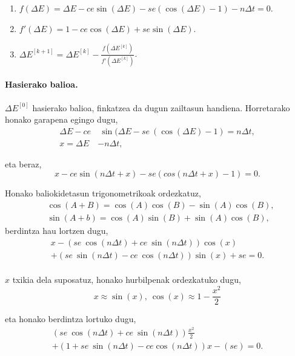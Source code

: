 \begin{enumerate}
\item $f(\Delta E)=\Delta E - ce \sin(\Delta E)- se (\cos(\Delta E)-1)-n \Delta t=0$.

\item $f'(\Delta E)=1-ce \cos(\Delta E)+ se \sin(\Delta E)$.

\item $\Delta E^{[k+1]}=\Delta E^{[k]}- \frac{f(\Delta E^{[k]})}{f'(\Delta E^{[k]})}$.

\end{enumerate}

\paragraph*{Hasierako balioa.} $\Delta E^{[0]}$ hasierako balioa, finkatzea da dugun zailtasun handiena. Horretarako honako garapena egingo dugu,
\begin{align*}
\Delta E - ce& \ \sin(\Delta E- se \ (\cos(\Delta E)-1)=n \Delta t, \\
x= \Delta E &- n \Delta t,
\end{align*}

eta beraz,
\begin{equation*}
x-ce \sin(n\Delta t+x)-se(cos(n \Delta t+x)-1)=0.
\end{equation*}

Honako baliokidetasun trigonometrikoak ordezkatuz,
\begin{align*}
& \cos(A+B) =\cos(A)\cos(B)-\sin(A)\cos(B),\\
& \sin(A+b) =\cos(A)\sin(B)+\sin(A)\cos(B),
\end{align*}
berdintza hau lortzen dugu,
\begin{multline*}
x- (se \ \cos(n \Delta t)+ ce \ \sin(n \Delta t)) \cos(x) \\
    + (se \ \sin(n \Delta t)-ce \ \cos(n \Delta t)) \sin(x)+se =0.
\end{multline*}

\paragraph*{}$x$ txikia dela suposatuz, honako hurbilpenak ordezkatuko dugu,
\begin{equation*}
x \approx \sin(x), \ \cos(x) \approx 1- \frac{x^2}{2}
\end{equation*}

eta honako berdintza lortuko dugu,
\begin{multline*}
(se \ \cos(n \Delta t)+ce \ \sin(n \Delta t)) \frac{x^2}{2} \\
+ (1+se \ \sin(n \Delta t)-ce \cos(n \Delta t))x-(se )=0.
\end{multline*}

